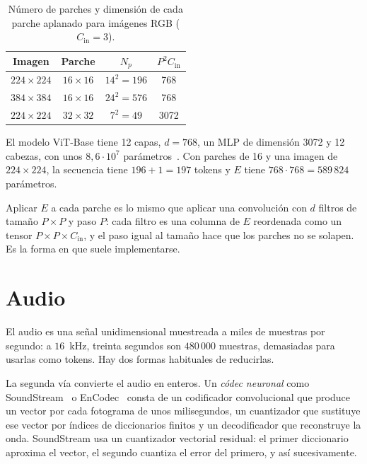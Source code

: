 \begin{table}[ht]
\centering\small
\caption{Número de parches y dimensión de cada parche aplanado para imágenes RGB ($C_{\mathrm{in}}=3$).}\label{tab:vit}
\begin{tabular}{@{}cccc@{}}
\toprule
Imagen & Parche & $N_p$ & $P^{2}C_{\mathrm{in}}$ \\
\midrule
$224\times 224$ & $16\times 16$ & $14^{2}=196$ & 768 \\
$384\times 384$ & $16\times 16$ & $24^{2}=576$ & 768 \\
$224\times 224$ & $32\times 32$ & $7^{2}=49$ & 3072 \\
\bottomrule
\end{tabular}
\end{table}

El modelo ViT-Base tiene 12 capas, $d=768$, un MLP de dimensión 3072 y 12 cabezas, con unos $8{,}6\cdot 10^{7}$ parámetros~\cite[tabla~1]{vit}. Con parches de 16 y una imagen de $224\times 224$, la secuencia tiene $196+1=197$ tokens y $E$ tiene $768\cdot 768=589\,824$ parámetros.

\begin{observacion}
Aplicar $E$ a cada parche es lo mismo que aplicar una convolución con $d$ filtros de tamaño $P\times P$ y paso $P$: cada filtro es una columna de $E$ reordenada como un tensor $P\times P\times C_{\mathrm{in}}$, y el paso igual al tamaño hace que los parches no se solapen. Es la forma en que suele implementarse.
\end{observacion}

\section{Audio}

El audio es una señal unidimensional muestreada a miles de muestras por segundo: a $16$~kHz, treinta segundos son $480\,000$ muestras, demasiadas para usarlas como tokens. Hay dos formas habituales de reducirlas.

\addtocounter{definicion}{1}%

La segunda vía convierte el audio en enteros. Un \emph{códec neuronal} como SoundStream~\cite{soundstream} o EnCodec~\cite{encodec} consta de un codificador convolucional que produce un vector por cada fotograma de unos milisegundos, un cuantizador que sustituye ese vector por índices de diccionarios finitos y un decodificador que reconstruye la onda. SoundStream usa un cuantizador vectorial residual: el primer diccionario aproxima el vector, el segundo cuantiza el error del primero, y así sucesivamente.


